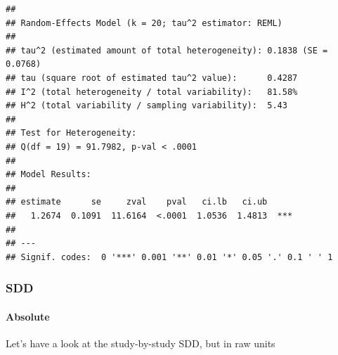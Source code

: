 \documentclass[
]{article}
\begin{document}
\begin{verbatim}
## 
## Random-Effects Model (k = 20; tau^2 estimator: REML)
## 
## tau^2 (estimated amount of total heterogeneity): 0.1838 (SE = 0.0768)
## tau (square root of estimated tau^2 value):      0.4287
## I^2 (total heterogeneity / total variability):   81.58%
## H^2 (total variability / sampling variability):  5.43
## 
## Test for Heterogeneity:
## Q(df = 19) = 91.7982, p-val < .0001
## 
## Model Results:
## 
## estimate      se     zval    pval   ci.lb   ci.ub 
##   1.2674  0.1091  11.6164  <.0001  1.0536  1.4813  *** 
## 
## ---
## Signif. codes:  0 '***' 0.001 '**' 0.01 '*' 0.05 '.' 0.1 ' ' 1
\end{verbatim}

\hypertarget{sdd}{%
\subsubsection{SDD}\label{sdd}}

\hypertarget{absolute}{%
\paragraph{Absolute}\label{absolute}}

Let's have a look at the study-by-study SDD, but in raw units
\end{document}
